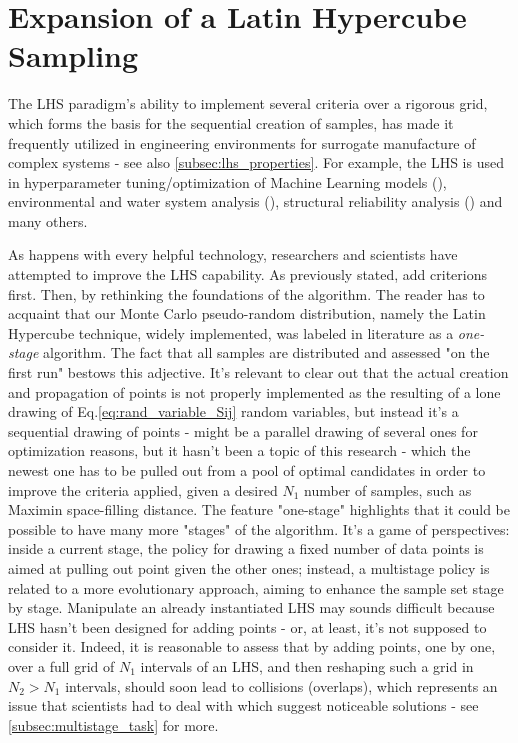 \documentclass[12pt]{article}
\newcommand{\meqref}[1]{Eq.\ref{#1}}
\begin{document}
\section{Expansion of a Latin Hypercube Sampling}
\label{sec:lhs_expansion}
The LHS paradigm's ability to implement several criteria over a rigorous grid, which forms the basis for the sequential creation of samples, has made it frequently utilized in engineering environments for surrogate manufacture of complex systems - see also \cref{subsec:lhs_properties}. For example, the LHS is used in hyperparameter tuning/optimization of Machine Learning models (), environmental and water system analysis (), structural reliability analysis () and many others.

As happens with every helpful technology, researchers and scientists have attempted to improve the LHS capability. As previously stated, add criterions first. Then, by rethinking the foundations of the algorithm. The reader has to acquaint that our Monte Carlo pseudo-random distribution, namely the Latin Hypercube technique, widely implemented, was labeled in literature as a \textit{one-stage} algorithm. The fact that all samples are distributed and assessed "on the first run" bestows this adjective. It's relevant to clear out that the actual creation and propagation of points is not properly implemented as the resulting of a lone drawing of \meqref{eq:rand_variable_Sij} random variables, but instead it's a sequential drawing of points - might be a parallel drawing of several ones for optimization reasons, but it hasn't been a topic of this research - which the newest one has to be pulled out from a pool of optimal candidates in order to improve the criteria applied, given a desired $N_1$ number of samples, such as Maximin space-filling distance. The feature "one-stage" highlights that it could be possible to have many more "stages" of the algorithm. It's a game of perspectives: inside a current stage, the policy for drawing a fixed number of data points is aimed at pulling out point given the other ones; instead, a multistage policy is related to a more evolutionary approach, aiming to enhance the sample set stage by stage. Manipulate an already instantiated LHS may sounds difficult because LHS hasn't been designed for adding points - or, at least, it's not supposed to consider it. Indeed, it is reasonable to assess that by adding points, one by one, over a full grid of $N_1$ intervals of an LHS, and then reshaping such a grid in $N_2 > N_1$ intervals, should soon lead to collisions (overlaps), which represents an issue that scientists had to deal with which suggest noticeable solutions - see \cref{subsec:multistage_task} for more.
\end{document}
